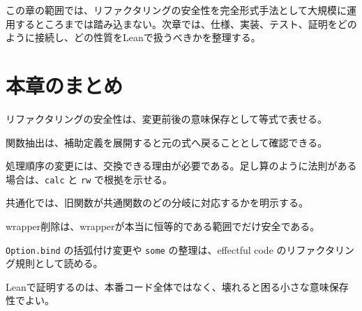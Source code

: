 この章の範囲では、リファクタリングの安全性を完全形式手法として大規模に運用するところまでは踏み込まない。次章では、仕様、実装、テスト、証明をどのように接続し、どの性質をLeanで扱うべきかを整理する。

\section{本章のまとめ}

リファクタリングの安全性は、変更前後の意味保存として等式で表せる。

関数抽出は、補助定義を展開すると元の式へ戻ることとして確認できる。

処理順序の変更には、交換できる理由が必要である。足し算のように法則がある場合は、\texttt{calc} と \texttt{rw} で根拠を示せる。

共通化では、旧関数が共通関数のどの分岐に対応するかを明示する。

wrapper削除は、wrapperが本当に恒等的である範囲でだけ安全である。

\texttt{Option.bind} の括弧付け変更や \texttt{some} の整理は、effectful code のリファクタリング規則として読める。

Leanで証明するのは、本番コード全体ではなく、壊れると困る小さな意味保存性でよい。
